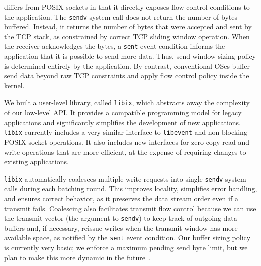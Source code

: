 \ix differs from POSIX sockets in that it directly exposes flow
control conditions to the application. The \texttt{sendv} system call
does not return the number of bytes buffered. Instead, it returns the
number of bytes that were accepted and sent by the TCP stack, as
constrained by correct TCP sliding window operation. When the receiver
acknowledges the bytes, a \texttt{sent} event condition informs the
application that it is possible to send more data. Thus, send window-sizing policy is determined entirely by the application.  By contrast,
conventional OSes buffer send data beyond raw TCP constraints and
apply flow control policy inside the kernel.


We built a user-level library, called \texttt{libix}, which abstracts
away the complexity of our low-level API. It provides a compatible
programming model for legacy applications and significantly simplifies
the development of new applications. \texttt{libix} currently includes a
very similar interface to \texttt{libevent} and
non-blocking POSIX socket operations. It also includes new interfaces
for zero-copy read and write operations that are more efficient, at
the expense of requiring changes to existing applications.

\texttt{libix} automatically coalesces multiple write requests into single
\texttt{sendv} system calls during each batching round. This improves
locality, simplifies error handling, and ensures correct behavior,
as it preserves the data stream order even if a transmit fails.
Coalescing also facilitates transmit flow control because
we can use the transmit vector (the argument to \texttt{sendv})
to keep track of outgoing data buffers and, if necessary, reissue
writes when the transmit window has more available space, as notified
by the \texttt{sent} event condition. Our buffer sizing policy is currently
very basic; we enforce a maximum pending send byte limit, but
we plan to make this more dynamic in the future~\cite{dynamicwindow}.


